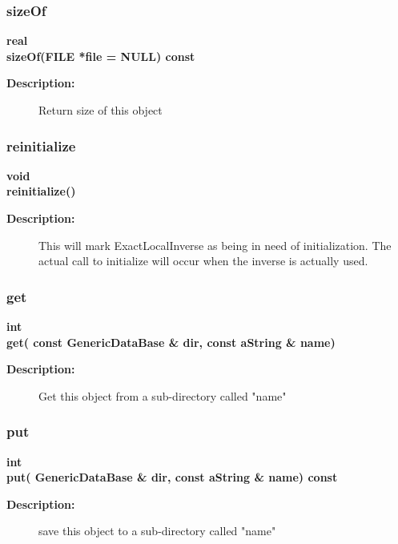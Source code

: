 \subsubsection{sizeOf}
 
\begin{flushleft} \textbf{%
real  \\ 
\settowidth{\ExactLocalInverseIncludeArgIndent}{sizeOf(}%
sizeOf(FILE *file  = NULL) const
}\end{flushleft}
\begin{description}
\item[{\bf Description:}] 
   Return size of this object  
\end{description}
\subsubsection{reinitialize}
 
\begin{flushleft} \textbf{%
void  \\ 
\settowidth{\ExactLocalInverseIncludeArgIndent}{reinitialize(}%
reinitialize()
}\end{flushleft}
\begin{description}
\item[{\bf Description:}] 
   This will mark ExactLocalInverse as being in need of initialization.
   The actual call to initialize will occur when the inverse is actually used.
\end{description}
\subsubsection{get}
 
\begin{flushleft} \textbf{%
int  \\ 
\settowidth{\ExactLocalInverseIncludeArgIndent}{get(}%
get( const GenericDataBase \& dir, const aString \& name)
}\end{flushleft}
\begin{description}
\item[{\bf Description:}] 
    Get this object from a sub-directory called "name"
\end{description}
\subsubsection{put}
 
\begin{flushleft} \textbf{%
int   \\ 
\settowidth{\ExactLocalInverseIncludeArgIndent}{put(}%
put( GenericDataBase \& dir, const aString \& name) const
}\end{flushleft}
\begin{description}
\item[{\bf Description:}] 
 save this object to a sub-directory called "name"
\end{description}
